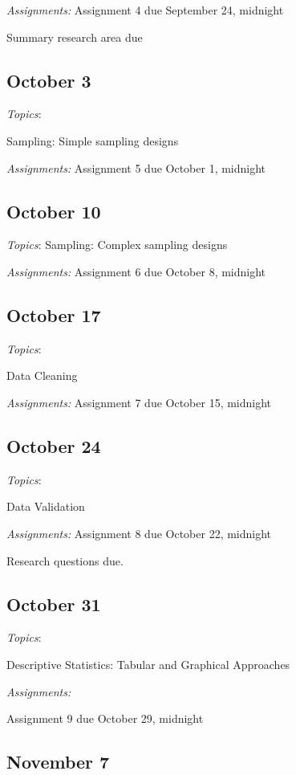 \documentclass[12pt]{article}
\begin{document}
\begin{flushleft}
\textit {Assignments:}
Assignment 4 due September 24, midnight

Summary research area due

\subsection{October 3}


\textit{Topics}:

Sampling: Simple sampling designs

\textit {Assignments:}
Assignment 5 due October 1, midnight
\subsection{October 10}


\textit{Topics}:
Sampling: Complex sampling designs


\textit {Assignments:}
Assignment 6 due October 8, midnight
\subsection{October 17}


\textit{Topics}:

Data Cleaning

\textit {Assignments:}
Assignment 7 due October 15, midnight

\subsection{October 24}


\textit{Topics}:

Data Validation

\textit {Assignments:}
Assignment 8 due October 22, midnight

Research questions due. 

\subsection{October 31}


\textit{Topics}:

Descriptive Statistics: Tabular and Graphical Approaches

\textit {Assignments:}

Assignment 9 due October 29, midnight

\subsection{November 7}



\end{flushleft}
\end{document}

